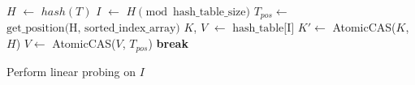 \documentclass[nonacm,sigplan]{acmart}
\begin{document}
\begin{algorithm}[t]
\caption{Hash table construction algorithm}
\label{alg:hashtable-construct}
\begin{algorithmic}[1]
\State $H$ $\gets$ $hash(T)$
\State $I$ $\gets$ $H \pmod{\text{hash\_table\_size}}$
\State $T_{pos} \gets$ $\text{get\_position(H, sorted\_index\_array)}$
\State $K$, $V$ $\gets$ $\text{hash\_table[I]}$
\State $K' \gets$ AtomicCAS($K$, $H$)
\State $V \gets$  AtomicCAS($V$, $T_{pos}$)
\State \textbf{break} 
\EndIf
\EndWhile

\Else
\State Perform linear probing on $I$
\EndIf
\EndWhile
\EndFor
\end{algorithmic}
\end{algorithm}
\end{document}
